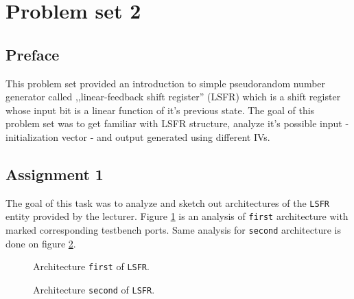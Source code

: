 \section{Problem set 2}
\subsection{Preface}
This problem set provided an introduction to simple pseudorandom number
generator called ,,linear-feedback shift register'' (LSFR) which is a shift
register whose input bit is a linear function of it's previous state. The goal
of this problem set was to get familiar with LSFR structure, analyze it's possible
input - initialization vector - and output generated using different IVs.

\subsection{Assignment 1}
The goal of this task was to analyze and sketch out architectures of the
\texttt{LSFR} entity provided by the lecturer. Figure \ref{fig:assignment1-lsfr_first}
is an analysis of \texttt{first} architecture with marked corresponding testbench
ports. Same analysis for \texttt{second} architecture is done on figure \ref{fig:assignment1-lsfr_second}.

\begin{figure}[!htb]
  \caption{\label{fig:assignment1-lsfr_first} Architecture \texttt{first} of \texttt{LSFR}.}
\end{figure}

\begin{figure}[!htb]
  \caption{\label{fig:assignment1-lsfr_second} Architecture \texttt{second} of \texttt{LSFR}.}
\end{figure}

